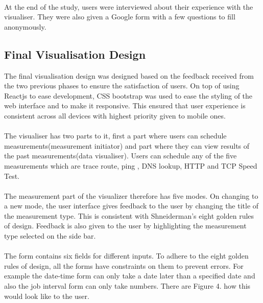 \paragraph{}
At the end of the study, users were interviewed about their experience with the visualiser. They were also given a Google form with a few questions to fill anonymously.

\subsection{Final Visualisation Design}
The final visualisation design was designed based on the feedback received from the two previous phases to ensure the satisfaction of users. On top of using Reactjs to ease development, CSS bootstrap was used to ease the styling of the web interface and to make it responsive. This ensured that user experience is consistent across all devices with highest priority given to mobile ones. 
\paragraph{}
The visualiser has two parts to it, first a part where users can schedule measurements(measurement initiator) and part where they can view results of the past measurements(data visualiser). Users can schedule any of the five measurements which are trace route, ping , DNS lookup, HTTP and TCP  Speed Test. 
\paragraph{}
The measurement part of the visualizer therefore has five modes. On changing to a new mode, the user interface gives feedback to the user by changing the title of the measurement type. This is consistent with Shneiderman's eight golden rules of design\cite{Shneiderman:2016:DUI:3033040}. Feedback is also given to the user by highlighting the measurement type selected on the side bar. 
\paragraph{}
The form contains six fields for different inputs. To adhere to the eight golden rules of design, all the forms have constraints on them to prevent errors. For example the date-time form can only take a date later than a specified date and also the job interval form can only take numbers\cite{Shneiderman:2016:DUI:3033040}.
There are  Figure 4. how this would look like to the user. 

